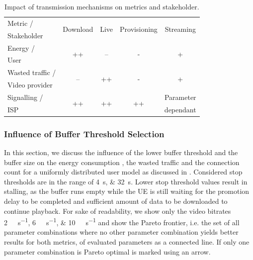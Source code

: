 \begin{table}
  \centering
  \begin{tabular}{lcccc}
    \toprule
    Metric /& \multirow{2}{*}{Download} & \multirow{2}{*}{Live} & \multirow{2}{*}{Provisioning} & \multirow{2}{*}{Streaming}\\
    Stakeholder & & & &\\
    \midrule
    Energy /       & \multirow{2}{*}{++}       & \multirow{2}{*}{--}   & \multirow{2}{*}{-} & \multirow{2}{*}{+}\\
    User & & & &\\
    Wasted traffic / & \multirow{2}{*}{--} & \multirow{2}{*}{++} & \multirow{2}{*}{-} & \multirow{2}{*}{+} \\
    Video provider & & & &\\
    Signalling /& \multirow{2}{*}{++} & \multirow{2}{*}{++} & \multirow{2}{*}{++} & Parameter\\
    \gls{ISP} & & & &dependant\\
    \bottomrule
  \end{tabular}
  \caption{Impact of transmission mechanisms on metrics and stakeholder.}
  \label{tab:application:lte_video:trade_offs:mechanism_selection:lessons_learned}
\end{table}

\subsubsection*{Influence of Buffer Threshold Selection}\label{sec:application:lte_video:trade_offs:buffer_threshold_influence}

In this section, we discuss the influence of the lower buffer threshold \bufferlower and the buffer size \buffersize on the energy consumption \energyconsumption, the wasted traffic \meanwastedtraffic and the connection count \connectioncount for a uniformly distributed user model as discussed in .
Considered stop thresholds are in the range of \SIlist{4;32}{\second}.
Lower stop threshold values result in stalling, as the buffer runs empty while the \gls{UE} is still waiting for the promotion delay to be completed and sufficient amount of data to be downloaded to continue playback.
For sake of readability, we show only the video bitrates \SIlist{2;6;10}{\mega\bit\per\second} and show the Pareto frontier, i.e. the set of all parameter combinations where no other parameter combination yields better results for both metrics, of evaluated parameters as a connected line.
If only one parameter combination is Pareto optimal is marked using an arrow.

